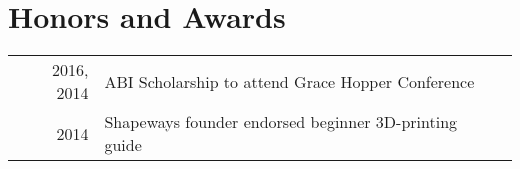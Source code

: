 \documentclass[]{jackie_loven_resume}
\begin{document}
\begin{minipage}[t]{0.66\textwidth}
  \section{Honors and Awards} 
  \begin{tabular}{rll}
    2016, 2014	   & ABI Scholarship to attend Grace Hopper Conference \\
                          2014              & Shapeways founder endorsed beginner 3D-printing guide
  \end{tabular}
  \sectionsep





\end{minipage} 
\end{document}
